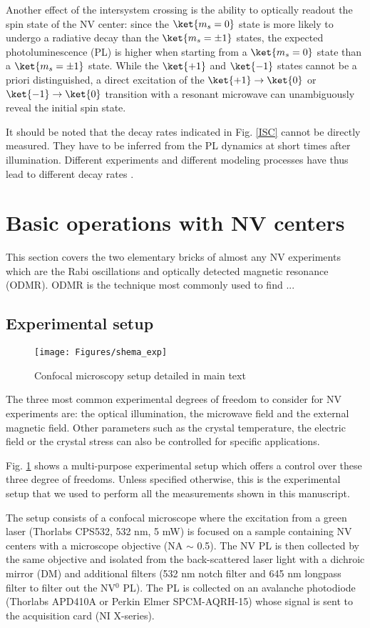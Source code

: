 \documentclass[a4paper,11pt]{report}
\begin{document}
Another effect of the intersystem crossing is the ability to optically readout the spin state of the NV center: since the $\ket{m_s=0}$ state is more likely to undergo a radiative decay than the $\ket{m_s=\pm 1}$ states, the expected photoluminescence (PL) is higher when starting from a $\ket{m_s=0}$ state than a $\ket{m_s=\pm 1}$ state. While the $\ket{+1}$ and $\ket{-1}$ states cannot be a priori distinguished, a direct excitation of the $\ket{+1} \to \ket{0}$ or $\ket{-1} \to \ket{0}$ transition with a resonant microwave can unambiguously reveal the initial spin state.

It should be noted that the decay rates indicated in Fig. \ref{ISC} cannot be directly measured. They have to be inferred from the PL dynamics at short times after illumination. Different experiments and different modeling processes have thus lead to different decay rates \citep{duarte2021effect}. 


\section{Basic operations with NV centers}

This section covers the two elementary bricks of almost any NV experiments which are the Rabi oscillations and optically detected magnetic resonance (ODMR). ODMR is the technique most commonly used to find ...

\subsection{Experimental setup}
\begin{figure}[h!]
\centering
\texttt{[image: Figures/shema\_exp]}
\caption{Confocal microscopy setup detailed in main text}
\label{setup}
\end{figure}
The three most common experimental degrees of freedom to consider for NV experiments are: the optical illumination, the microwave field and the external magnetic field. Other parameters such as the crystal temperature, the electric field or the crystal stress can also be controlled for specific applications.

Fig. \ref{setup} shows a multi-purpose experimental setup which offers a control over these three degree of freedoms. Unless specified otherwise, this is the experimental setup that we used to perform all the measurements shown in this manuscript. 

The setup consists of a confocal microscope where the excitation from a green laser (Thorlabs CPS532, 532 nm, 5 mW) is focused on a sample containing NV centers with a microscope objective (NA $\sim$ 0.5). The NV PL is then collected by the same objective and isolated from the back-scattered laser light with a dichroic mirror (DM) and additional filters (532 nm notch filter and 645 nm longpass filter to filter out the NV$^0$ PL). The PL is collected on an avalanche photodiode (Thorlabs APD410A or Perkin Elmer SPCM-AQRH-15) whose signal is sent to the acquisition card (NI X-series).
\end{document}
